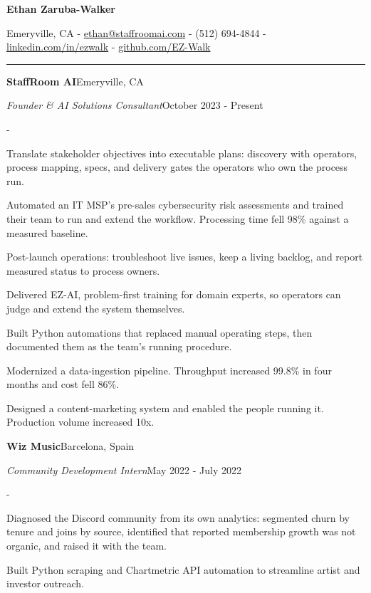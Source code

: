 \documentclass[10pt,letterpaper]{article}
\newenvironment{cvitems}{%
  \begin{list}{-}{%
    \setlength{\leftmargin}{12pt}%
    \setlength{\itemsep}{2.0pt}%
    \setlength{\parsep}{0pt}%
    \setlength{\topsep}{1.5pt}%
    \setlength{\partopsep}{0pt}%
    \setlength{\labelwidth}{6pt}%
    \setlength{\labelsep}{6pt}%
    \setlength{\itemindent}{0pt}%
  }%
}{\end{list}}
\newcommand{\cvsection}[1]{%
  \vspace{7pt}%
  \noindent{\bfseries\fontsize{11pt}{13pt}\selectfont\MakeUppercase{#1}}\par
  \vspace{1pt}%
  \noindent\rule{\textwidth}{0.4pt}\par
  \vspace{4pt}%
}
\newcommand{\cventryhead}[4]{%
  \noindent\textbf{#1}\hfill#2\par
  \vspace{0.5pt}%
  \noindent\textit{#3}\hfill#4\par
}
\begin{document}
\begin{center}
  {\bfseries\fontsize{22pt}{24pt}\selectfont Ethan Zaruba-Walker\par}
  \vspace{4pt}
  {\fontsize{10pt}{12pt}\selectfont
    Emeryville, CA
    {-}
    \href{mailto:ethan@staffroomai.com}{ethan@staffroomai.com}
    {-}
    (512) 694-4844
    {-}
    \href{https://linkedin.com/in/ezwalk}{linkedin.com/in/ezwalk}
    {-}
    \href{https://github.com/EZ-Walk}{github.com/EZ-Walk}\par}
\end{center}
\vspace{2pt}

\cvsection{Experience}

\cventryhead{StaffRoom AI}{Emeryville, CA}
{Founder \& AI Solutions Consultant}{October 2023 - Present}
\begin{cvitems}
  \item Translate stakeholder objectives into executable plans: discovery with operators, process mapping, specs, and delivery gates the operators who own the process run.
  \item Automated an IT MSP's pre-sales cybersecurity risk assessments and trained their team to run and extend the workflow. Processing time fell 98\% against a measured baseline.
  \item Post-launch operations: troubleshoot live issues, keep a living backlog, and report measured status to process owners.
  \item Delivered EZ-AI, problem-first training for domain experts, so operators can judge and extend the system themselves.
  \item Built Python automations that replaced manual operating steps, then documented them as the team's running procedure.
  \item Modernized a data-ingestion pipeline. Throughput increased 99.8\% in four months and cost fell 86\%.
  \item Designed a content-marketing system and enabled the people running it. Production volume increased 10x.
\end{cvitems}

\vspace{3pt}
\cventryhead{Wiz Music}{Barcelona, Spain}
{Community Development Intern}{May 2022 - July 2022}
\begin{cvitems}
  \item Diagnosed the Discord community from its own analytics: segmented churn by tenure and joins by source, identified that reported membership growth was not organic, and raised it with the team.
  \item Built Python scraping and Chartmetric API automation to streamline artist and investor outreach.
\end{cvitems}
\end{document}
